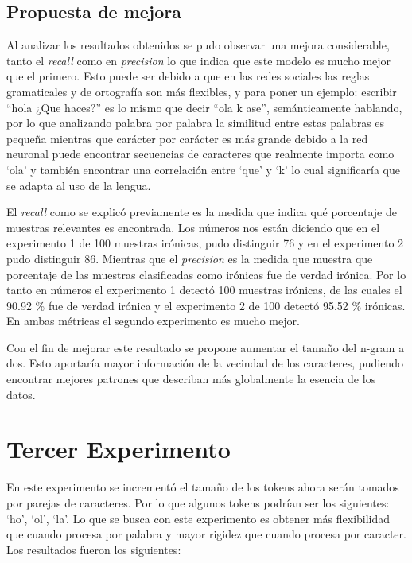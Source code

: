 \subsection{Propuesta de mejora} %

\par Al analizar los resultados obtenidos se pudo observar una mejora considerable, tanto el \textit{recall} como en \textit{precision} lo que indica que este modelo es mucho mejor que el primero. Esto puede ser debido a que en las redes sociales las reglas gramaticales y de ortografía son más flexibles, y para poner un ejemplo: escribir
``hola ¿Que haces?'' es lo mismo que decir ``ola k ase'', semánticamente hablando, por lo que analizando palabra por palabra la similitud entre estas palabras es pequeña mientras que carácter por carácter es más grande debido a la red neuronal puede encontrar secuencias de caracteres que realmente importa como `ola'  y también encontrar una correlación entre `que' y `k' lo cual significaría que se adapta al uso de la lengua.

\par El \textit{recall} como se explicó previamente es la medida que indica qué porcentaje de muestras relevantes es encontrada. Los números nos están diciendo que en el experimento 1 de 100 muestras irónicas, pudo distinguir 76 y en el experimento 2 pudo distinguir 86. Mientras que el \textit{precision} es la medida que muestra que porcentaje de las muestras clasificadas como irónicas fue de verdad irónica. Por lo tanto en números el experimento 1 detectó 100 muestras irónicas, de las cuales el 90.92 \% fue de verdad irónica y el experimento 2 de 100 detectó 95.52 \% irónicas. En ambas métricas el segundo experimento es mucho mejor.

\par Con el fin de mejorar este resultado se propone aumentar el tamaño del n-gram a dos. Esto aportaría mayor información de la vecindad de los caracteres, pudiendo encontrar mejores patrones que describan más globalmente la esencia de los datos.

\section{Tercer Experimento}
\par En este experimento se incrementó el tamaño de los tokens ahora serán tomados por parejas de caracteres. Por lo que algunos tokens podrían ser los siguientes: `ho', `ol', `la'. Lo que se busca con este experimento es obtener más flexibilidad que cuando procesa por palabra y mayor rigidez que cuando procesa por caracter. Los resultados fueron los siguientes:

